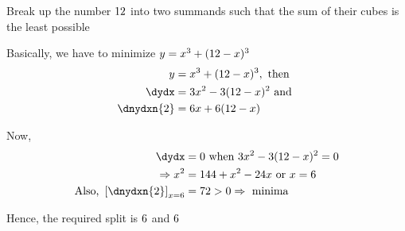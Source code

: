 


\question[2] Break up the number $12$ into two summands such that the sum of their cubes
is the least possible

\watchout 

\ifprintanswers
\fi

\begin{solution}[\halfpage]
   Basically, we have to minimize $y = x^3 + (12-x)^3$
   \begin{align}
      y &= x^3 + (\vbone -x)^3, \text{ then } \\
      \dydx &= 3x^2 - 3(\vbone - x)^2 \text{ and } \\
      \dnydxn{2} &= 6x + 6(\vbone-x)
   \end{align}
   
   Now, 
   \begin{align}
      \dydx &= 0 \text { when } 3x^2 - 3(\vbone - x)^2 = 0 \\
      \Rightarrow x^2 &= \vbfour + x^2 - \vbthree x \text{ or } x = \vbtwo \\
      \text{Also, }\left[\dnydxn{2}\right]_{x=\vbtwo} &= \vbfive > 0 \Rightarrow \text{ minima }
   \end{align}
   
   Hence, the required split is $6$ and $6$
\end{solution}
